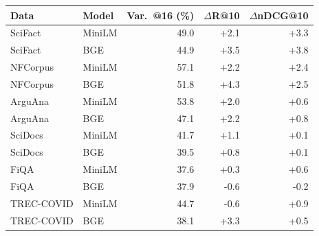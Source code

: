 \begin{center}
\label{tab:aniso}
\small
\begin{tabular}{llrrr}
\toprule
Data & Model & Var.\ @16 (\%) & $\Delta$R@10 & $\Delta$nDCG@10 \\
\midrule
SciFact & MiniLM & 49.0 & +2.1 & +3.3 \\
SciFact & BGE & 44.9 & +3.5 & +3.8 \\
NFCorpus & MiniLM & 57.1 & +2.2 & +2.4 \\
NFCorpus & BGE & 51.8 & +4.3 & +2.5 \\
ArguAna & MiniLM & 53.8 & +2.0 & +0.6 \\
ArguAna & BGE & 47.1 & +2.2 & +0.8 \\
SciDocs & MiniLM & 41.7 & +1.1 & +0.1 \\
SciDocs & BGE & 39.5 & +0.8 & +0.1 \\
FiQA & MiniLM & 37.6 & +0.3 & +0.6 \\
FiQA & BGE & 37.9 & -0.6 & -0.2 \\
TREC-COVID & MiniLM & 44.7 & -0.6 & +0.9 \\
TREC-COVID & BGE & 38.1 & +3.3 & +0.5 \\
\bottomrule
\end{tabular}
\end{center}
